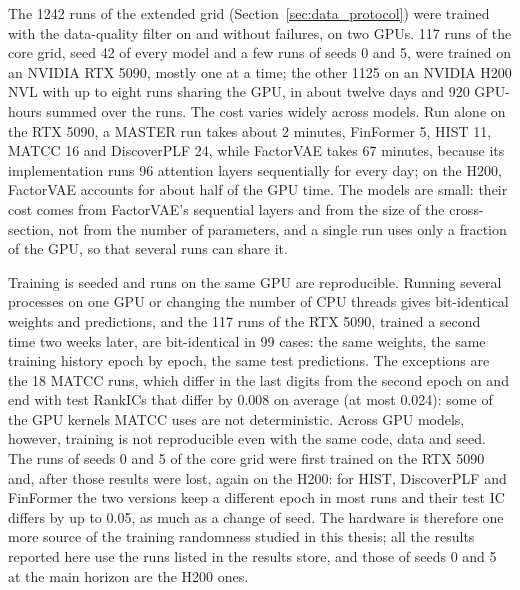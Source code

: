 The 1242 runs of the extended grid (Section~\ref{sec:data_protocol}) were trained with the data-quality filter on and without failures, on two GPUs. 117 runs of the core grid, seed 42 of every model and a few runs of seeds 0 and 5, were trained on an NVIDIA RTX 5090, mostly one at a time; the other 1125 on an NVIDIA H200 NVL with up to eight runs sharing the GPU, in about twelve days and 920 GPU-hours summed over the runs. The cost varies widely across models. Run alone on the RTX 5090, a MASTER run takes about 2 minutes, FinFormer 5, HIST 11, MATCC 16 and DiscoverPLF 24, while FactorVAE takes 67 minutes, because its implementation runs 96 attention layers sequentially for every day; on the H200, FactorVAE accounts for about half of the GPU time. The models are small: their cost comes from FactorVAE's sequential layers and from the size of the cross-section, not from the number of parameters, and a single run uses only a fraction of the GPU, so that several runs can share it.

Training is seeded and runs on the same GPU are reproducible. Running several processes on one GPU or changing the number of CPU threads gives bit-identical weights and predictions, and the 117 runs of the RTX 5090, trained a second time two weeks later, are bit-identical in 99 cases: the same weights, the same training history epoch by epoch, the same test predictions. The exceptions are the 18 MATCC runs, which differ in the last digits from the second epoch on and end with test RankICs that differ by 0.008 on average (at most 0.024): some of the GPU kernels MATCC uses are not deterministic. Across GPU models, however, training is not reproducible even with the same code, data and seed. The runs of seeds 0 and 5 of the core grid were first trained on the RTX 5090 and, after those results were lost, again on the H200: for HIST, DiscoverPLF and FinFormer the two versions keep a different epoch in most runs and their test IC differs by up to 0.05, as much as a change of seed. The hardware is therefore one more source of the training randomness studied in this thesis; all the results reported here use the runs listed in the results store, and those of seeds 0 and 5 at the main horizon are the H200 ones.

